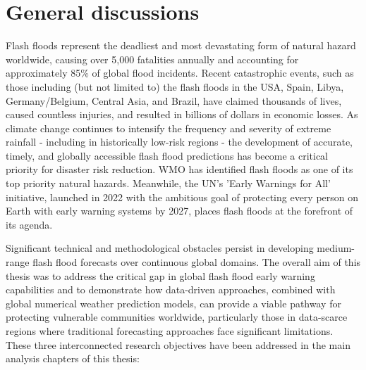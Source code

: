 \chapter{General discussions}
\label{general_discussions}
\graphicspath{{chapter_08/figures}{chapter_08/tables}}

\ClearShipoutPicture



Flash  floods represent the deadliest and most devastating form of natural hazard worldwide, causing over 5,000 fatalities annually and accounting for approximately 85\% of global flood incidents. Recent catastrophic events, such as those including (but not limited to) the flash floods in the USA, Spain, Libya, Germany/Belgium, Central Asia, and Brazil, have claimed thousands of lives, caused countless injuries, and resulted in billions of dollars in economic losses. As climate change continues to intensify the frequency and severity of extreme rainfall - including in historically low-risk regions - the development of accurate, timely, and globally accessible flash flood predictions has become a critical priority for disaster risk reduction. WMO has identified flash floods as one of its top priority natural hazards. Meanwhile, the UN's 'Early Warnings for All' initiative, launched in 2022 with the ambitious goal of protecting every person on Earth with early warning systems by 2027, places flash floods at the forefront of its agenda.

Significant  technical and methodological obstacles persist in developing medium-range flash flood forecasts over continuous global domains. The overall aim of this thesis was to address the critical gap in global flash flood early warning capabilities and to demonstrate how data-driven approaches, combined with global numerical weather prediction models, can provide a viable pathway for protecting vulnerable communities worldwide, particularly those in data-scarce regions where traditional forecasting approaches face significant limitations. These three interconnected research objectives have been addressed in the main analysis chapters of this thesis:

